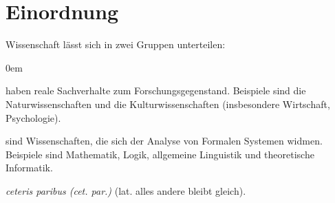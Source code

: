\section{Einordnung}

Wissenschaft lässt sich in zwei Gruppen unterteilen:
\begin{description}\itemsep0em
	\item [Realwissenschaften] haben reale Sachverhalte zum Forschungsgegenstand. Beispiele sind die Naturwissenschaften und die Kulturwissenschaften (insbesondere Wirtschaft, Psychologie).
	\item [Formalwissenschaften] sind Wissenschaften, die sich der Analyse von Formalen Systemen widmen. Beispiele sind Mathematik, Logik, allgemeine Linguistik und theoretische Informatik.
\end{description}

\textit{ceteris paribus (cet. par.)} (lat. alles andere bleibt gleich).\\